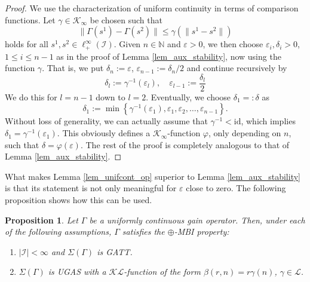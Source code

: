 \documentclass[10pt, oneside, a4paper]{article}
\newcommand{\N}{\mathbb{N}}
\newcommand{\ep}{\varepsilon}
\newcommand{\id}{\mathrm{id}}
\newcommand{\IC}{\mathcal{I}}
\newcommand{\KC}{\mathcal{K}}
\newcommand{\LC}{\mathcal{L}}
\newtheorem{proposition}{Proposition}[section]
\begin{document}
\begin{proof}
We use the characterization of uniform continuity in terms of comparison functions. Let $\gamma \in \KC_{\infty}$ be chosen such that%
\begin{equation*}
  \|\Gamma(s^1) - \Gamma(s^2)\| \leq \gamma(\|s^1 - s^2\|)%
\end{equation*}
holds for all $s^1,s^2 \in \ell^{\infty}_+(\IC)$. Given $n \in \N$ and $\ep > 0$, we then choose $\ep_i,\delta_i > 0$, $1 \leq i \leq n - 1$ as in the proof of Lemma \ref{lem_aux_stability}, now using the function $\gamma$. That is, we put $\delta_n := \ep$, $\ep_{n-1} := \delta_n/2$ and continue recursively by%
\begin{equation*}
  \delta_l := \gamma^{-1}(\ep_l), \quad \ep_{l-1} := \frac{\delta_l}{2}%
\end{equation*}
We do this for $l = n - 1$ down to $l = 2$. Eventually, we choose $\delta_1 =: \delta$ as%
\begin{equation*}
  \delta_1 := \min\left\{ \gamma^{-1}(\ep_1), \ep_1,\ep_2,\ldots,\ep_{n-1} \right\}.%
\end{equation*}
Without loss of generality, we can actually assume that $\gamma^{-1} < \id$, which implies $\delta_1 = \gamma^{-1}(\ep_1)$. This obviously defines a $\KC_{\infty}$-function $\varphi$, only depending on $n$, such that $\delta = \varphi(\ep)$. The rest of the proof is completely analogous to that of Lemma \ref{lem_aux_stability}.
\end{proof}

What makes Lemma \ref{lem_unifcont_op} superior to Lemma \ref{lem_aux_stability} is that its statement is not only meaningful for $\ep$ close to zero. The following proposition shows how this can be used.%

\begin{proposition}\label{prop_unifcont_gainop}
Let $\Gamma$ be a uniformly continuous gain operator. Then, under each of the following assumptions, $\Gamma$ satisfies the $\oplus$-MBI property:%
\begin{enumerate}
\item[(i)] $|\IC| < \infty$ and $\Sigma(\Gamma)$ is GATT.%
\item[(ii)] $\Sigma(\Gamma)$ is UGAS with a $\KC\LC$-function of the form $\beta(r,n) = r\gamma(n)$, $\gamma \in \LC$.%
\end{enumerate}
\end{proposition}
\end{document}
